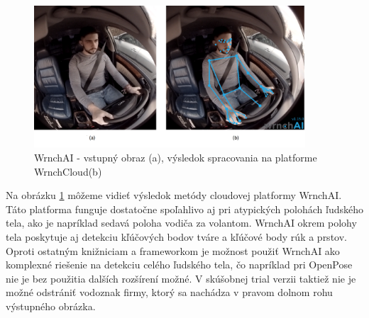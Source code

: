 \documentclass[slovak,master,dept460,male,cpp,cpdeclaration]{diploma}
\begin{document}
\begin{figure}[H]
	\centering
	\includegraphics[width=0.9\textwidth]{Figures/wrnchAI.png}
	\caption{WrnchAI - vstupný obraz (a), výsledok spracovania na platforme WrnchCloud(b)}
	\label{fig:wrnchAICloud}
\end{figure}

Na obrázku \ref{fig:wrnchAICloud} môžeme vidieť výsledok metódy cloudovej platformy WrnchAI. Táto platforma  funguje dostatočne spoľahlivo aj pri atypických polohách ľudského tela, ako je napríklad sedavá poloha vodiča za volantom. WrnchAI okrem polohy tela poskytuje aj detekciu kľúčových bodov tváre a kľúčové body rúk a prstov. Oproti ostatným knižniciam a frameworkom je možnost použiť WrnchAI ako komplexné riešenie na detekciu celého ľudského tela, čo napríklad pri OpenPose nie je bez použitia dalších rozšírení možné. V skúšobnej trial verzii  taktiež nie je možné odstrániť vodoznak firmy, ktorý sa nachádza v pravom dolnom rohu výstupného obrázka.


\newpage
\end{document}
